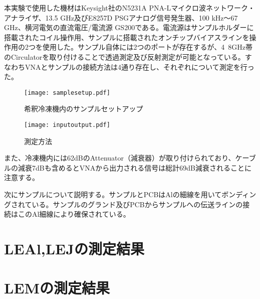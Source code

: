     本実験で使用した機材はKeysight社のN5231A PNA-Lマイクロ波ネットワーク・アナライザ、13.5 GHz及びE8257D PSGアナログ信号発生器、100 kHz～67 GHz、横河電気の直流電圧/電流源 GS200である。電流源はサンプルホルダーに搭載されたコイル操作用、サンプルに搭載されたオンチップバイアスラインを操作用の2つを使用した。サンプル自体には2つのポートが存在するが、4~8GHz帯のCirculatorを取り付けることで透過測定及び反射測定が可能となっている。すなわちVNAとサンプルの接続方法は4通り存在し、それぞれについて測定を行った。
    \begin{figure}[H]
        \begin{minipage}[t]{0.5\columnwidth}
            \centering
            \texttt{[image: samplesetup.pdf]}
            \caption{希釈冷凍機内のサンプルセットアップ}
        \end{minipage}%
        \begin{minipage}[t]{0.5\columnwidth}
            \centering
            \texttt{[image: inputoutput.pdf]}
            \caption{測定方法}
        \end{minipage}
    \end{figure}
    また、冷凍機内には62dBのAttenuator（減衰器）が取り付けられており、ケーブルの減衰7dBも含めるとVNAから出力される信号は総計69dB減衰されることに注意する。

    次にサンプルについて説明する。サンプルとPCBはAlの細線を用いてボンディングされている。サンプルのグランド及びPCBからサンプルへの伝送ラインの接続はこのAl細線により確保されている。
    \section{LEAl,LEJの測定結果}
    \section{LEMの測定結果}
